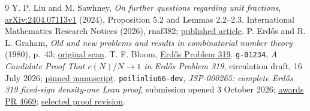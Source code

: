 \documentclass[11pt]{article}
\begin{document}
\begin{thebibliography}{9}
 Y. P. Liu and M. Sawhney,
\emph{On further questions regarding unit fractions},
\href{https://arxiv.org/html/2404.07113v1}{arXiv:2404.07113v1} (2024),
Proposition 5.2 and Lemmas 2.2--2.3.
International Mathematics Research Notices (2026), rnaf382;
\href{https://doi.org/10.1093/imrn/rnaf382}{published article}.
 P. Erd\H{o}s and R. L. Graham,
\emph{Old and new problems and results in combinatorial number theory}
(1980), p.~43;
\href{https://mathweb.ucsd.edu/~ronspubs/80_11_number_theory.pdf}{original scan}.
 T. F. Bloom,
\href{https://www.erdosproblems.com/319}{Erd\H{o}s Problem 319}.
 \texttt{g-01234},
\emph{A Candidate Proof That $c(N)/N\to1$ in Erd\H{o}s Problem 319},
circulation draft, 16 July 2026;
\href{https://github.com/g-01234/erdos-319-density-one/blob/f55a25a29dcb17193918d27506be5e7a5b5d7d40/docs/proof.md}{pinned manuscript}.
 \texttt{peilinliu66-dev},
\emph{JSP-000265: complete Erd\H{o}s 319 fixed-sign density-one Lean proof},
submission opened 3 October 2026;
\href{https://github.com/TheJustinSunPrize/awards/pull/4669}{awards PR 4669};
\href{https://github.com/peilinliu66-dev/jsp265-erdos319-density-one/tree/72545d3e68e8881e2f89f4744067583aaa61fc9e}{selected proof revision}.
\end{thebibliography}
\end{document}
